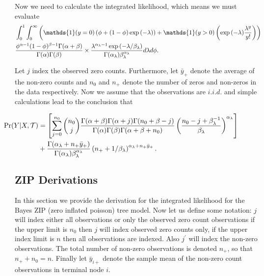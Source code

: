 \documentclass{article}
\def\newabbrev#1{\label{#1}}
\begin{document}
 Now we need to calculate the integrated likelihood, which means we must evaluate 
 \begin{align} \hspace{-.9in}
 &\int_0^1\int_0^\infty \left(\mathds{1}(y=0)\left(\phi + (1-\phi)\exp{(-\lambda)}\right) + \mathds{1}(y>0)\left(\exp{(-\lambda)}\frac{\lambda^y}{y!}\right)\right) \\ \nonumber
 & \frac{\phi^{\alpha-1}(1-\phi)^{\beta-1}\Gamma(\alpha+\beta)}{\Gamma(\alpha)\Gamma(\beta)} \times \frac{ \lambda^{\alpha_{\lambda}-1}\exp{(-\lambda/\beta_{\lambda})} }{\Gamma(\alpha_{\lambda})\beta_{\lambda}^{\alpha_{\lambda}}}d\lambda d\phi.
 \end{align}
 
 Let $j$ index the observed zero counts. Furthermore, let $\bar{y}_{+}$ denote the average of the non-zero counts and $n_0$ and $n_+$ denote the number of zeros and non-zeros in the data respectively. 
 Now we assume that the observations are $i.i.d.$ and simple calculations lead to the conclusion that
 
 \begin{align}\label{eqn:zip_int_lhood}\hspace{-.7in}
 \Pr(Y\vert X, \mathcal{T})& = \left[\sum_{j=0}^{n_0} {n_0 \choose j}\frac{\Gamma(\alpha+\beta)\Gamma(\alpha+j)\Gamma(n_0+\beta-j)}{\Gamma(\alpha)\Gamma(\beta)\Gamma(\alpha+\beta+n_0)}\left(\frac{n_0-j+\beta_{\lambda}^{-1}}{\beta_{\lambda}}\right)^{\alpha_{\lambda}} \right] \\ \nonumber
 & + \frac{\Gamma(\alpha_{\lambda}+n_+\bar{y}_+)}{\Gamma(\alpha_{\lambda})\beta_{\lambda}^{\alpha_{\lambda}}}\left(n_+ + 1/\beta_{\lambda} \right)^{\alpha_{\lambda}+n_+\bar{y}_+}.
\end{align}

\subsection{ZIP Derivations}

In this section we provide the derivation for the integrated likelihood for the Bayes ZIP\newabbrev{abbrev:ZIP} (zero inflated poisson) tree model. Now let us define some notation: $j$ will index either all observations or only the observed zero count observations if the upper limit is $n_0$ then $j$ will index observed zero counts only, if the upper index limit is $n$ then all observations are indexed. Also $j^{\prime}$ will index the non-zero observations. The total number of non-zero observations is denoted $n_+$, so that $n_++n_0=n$. Finally let $\bar{y}_{i+}$ denote the sample mean of the non-zero count observations in terminal node $i$. 
\end{document}
